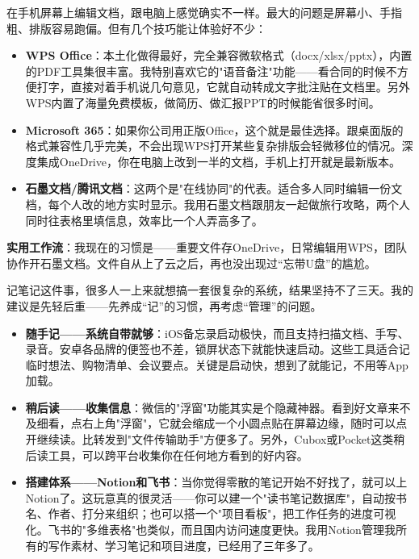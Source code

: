


在手机屏幕上编辑文档，跟电脑上感觉确实不一样。最大的问题是屏幕小、手指粗、排版容易跑偏。但有几个技巧能让体验好不少：

\begin{itemize}
  \item \textbf{WPS Office}：本土化做得最好，完全兼容微软格式（docx/xlsx/pptx），内置的PDF工具集很丰富。我特别喜欢它的"语音备注"功能——看合同的时候不方便打字，直接对着手机说几句意见，它就自动转成文字批注贴在文档里。另外WPS内置了海量免费模板，做简历、做汇报PPT的时候能省很多时间。
  \item \textbf{Microsoft 365}：如果你公司用正版Office，这个就是最佳选择。跟桌面版的格式兼容性几乎完美，不会出现WPS打开某些复杂排版会轻微移位的情况。深度集成OneDrive，你在电脑上改到一半的文档，手机上打开就是最新版本。
  \item \textbf{石墨文档/腾讯文档}：这两个是"在线协同"的代表。适合多人同时编辑一份文档，每个人改的地方实时显示。我用石墨文档跟朋友一起做旅行攻略，两个人同时往表格里填信息，效率比一个人弄高多了。
\end{itemize}

\textbf{实用工作流}：我现在的习惯是——重要文件存OneDrive，日常编辑用WPS，团队协作开石墨文档。文件自从上了云之后，再也没出现过“忘带U盘”的尴尬。


记笔记这件事，很多人一上来就想搞一套很复杂的系统，结果坚持不了三天。我的建议是先轻后重——先养成“记”的习惯，再考虑“管理”的问题。

\begin{itemize}
  \item \textbf{随手记——系统自带就够}：iOS备忘录启动极快，而且支持扫描文档、手写、录音。安卓各品牌的便签也不差，锁屏状态下就能快速启动。这些工具适合记临时想法、购物清单、会议要点。关键是启动快，想到了就能记，不用等App加载。
  \item \textbf{稍后读——收集信息}：微信的"浮窗"功能其实是个隐藏神器。看到好文章来不及细看，点右上角"浮窗"，它就会缩成一个小圆点贴在屏幕边缘，随时可以点开继续读。比转发到"文件传输助手"方便多了。另外，Cubox或Pocket这类稍后读工具，可以跨平台收集你在任何地方看到的好内容。
  \item \textbf{搭建体系——Notion和飞书}：当你觉得零散的笔记开始不好找了，就可以上Notion了。这玩意真的很灵活——你可以建一个"读书笔记数据库"，自动按书名、作者、打分来组织；也可以搭一个"项目看板"，把工作任务的进度可视化。飞书的"多维表格"也类似，而且国内访问速度更快。我用Notion管理我所有的写作素材、学习笔记和项目进度，已经用了三年多了。
\end{itemize}

